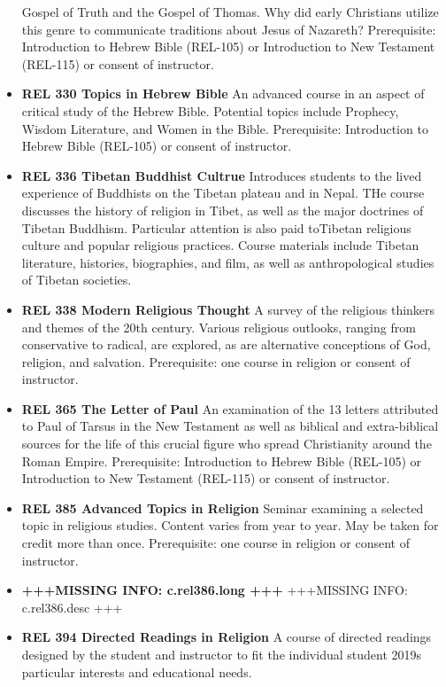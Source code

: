 \documentclass[
  letterpaper,
]{scrbook}
\begin{document}
\begin{itemize}
  Gospel of Truth and the Gospel of Thomas. Why did early Christians
  utilize this genre to communicate traditions about Jesus of Nazareth?
  Prerequisite: Introduction to Hebrew Bible (REL-105) or Introduction
  to New Testament (REL-115) or consent of instructor.
\item
  \textbf{REL 330 Topics in Hebrew Bible} An advanced course in an
  aspect of critical study of the Hebrew Bible. Potential topics include
  Prophecy, Wisdom Literature, and Women in the Bible. Prerequisite:
  Introduction to Hebrew Bible (REL-105) or consent of instructor.
\item
  \textbf{REL 336 Tibetan Buddhist Cultrue} Introduces students to the
  lived experience of Buddhists on the Tibetan plateau and in Nepal. THe
  course discusses the history of religion in Tibet, as well as the
  major doctrines of Tibetan Buddhism. Particular attention is also paid
  toTibetan religious culture and popular religious practices. Course
  materials include Tibetan literature, histories, biographies, and
  film, as well as anthropological studies of Tibetan societies.
\item
  \textbf{REL 338 Modern Religious Thought} A survey of the religious
  thinkers and themes of the 20th century. Various religious outlooks,
  ranging from conservative to radical, are explored, as are alternative
  conceptions of God, religion, and salvation. Prerequisite: one course
  in religion or consent of instructor.
\item
  \textbf{REL 365 The Letter of Paul} An examination of the 13 letters
  attributed to Paul of Tarsus in the New Testament as well as biblical
  and extra-biblical sources for the life of this crucial figure who
  spread Christianity around the Roman Empire. Prerequisite:
  Introduction to Hebrew Bible (REL-105) or Introduction to New
  Testament (REL-115) or consent of instructor.
\item
  \textbf{REL 385 Advanced Topics in Religion} Seminar examining a
  selected topic in religious studies. Content varies from year to year.
  May be taken for credit more than once. Prerequisite: one course in
  religion or consent of instructor.\\
\item
  \textbf{+++MISSING INFO: c.rel386.long +++} +++MISSING INFO:
  c.rel386.desc +++
\item
  \textbf{REL 394 Directed Readings in Religion} A course of directed
  readings designed by the student and instructor to fit the individual
  student 2019s particular interests and educational needs.

\end{itemize}
\end{document}
